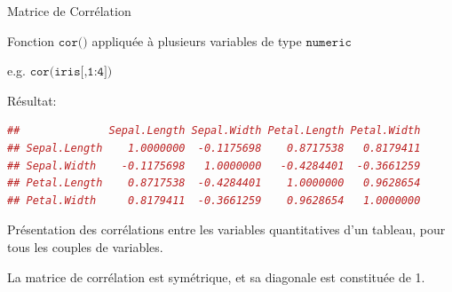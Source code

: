 \documentclass{beamer}
\begin{document}
\begin{frame}[fragile]{Matrice de Corrélation}

Fonction $\texttt{cor()}$  appliquée à plusieurs variables de type $\texttt{numeric}$

e.g. $\texttt{cor(iris[,1:4])}$


Résultat: 

\begin{tiny}
\begin{spacing}{0.75}
\begin{lstlisting}[language=R,basicstyle=\scriptsize\ttfamily, commentstyle=\ttfamily]
##              Sepal.Length Sepal.Width Petal.Length Petal.Width
## Sepal.Length    1.0000000  -0.1175698    0.8717538   0.8179411
## Sepal.Width    -0.1175698   1.0000000   -0.4284401  -0.3661259
## Petal.Length    0.8717538  -0.4284401    1.0000000   0.9628654
## Petal.Width     0.8179411  -0.3661259    0.9628654   1.0000000
\end{lstlisting}
\end{spacing}
\end{tiny}




Présentation des corrélations entre les variables quantitatives d’un tableau, pour tous les couples de variables.

La matrice de corrélation est symétrique, et sa diagonale est constituée de 1.

\end{frame}
\end{document}
